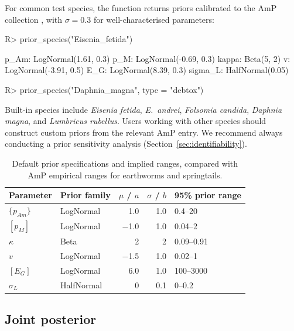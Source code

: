 \documentclass[article,shortnames]{jss}
\newcommand{\pAm}{\{p_{Am}\}}
\newcommand{\pM}{[p_M]}
\newcommand{\EG}{[E_G]}
\begin{document}
For common test species, the function  returns
priors calibrated to the AmP collection \citep{MarquesAmP2018},
with $\sigma = 0.3$ for well-characterised parameters:
\begin{CodeChunk}
\begin{CodeInput}
R> prior_species("Eisenia_fetida")
\end{CodeInput}
\begin{CodeOutput}
  p_Am:    LogNormal(1.61, 0.3)
  p_M:     LogNormal(-0.69, 0.3)
  kappa:   Beta(5, 2)
  v:       LogNormal(-3.91, 0.5)
  E_G:     LogNormal(8.39, 0.3)
  sigma_L: HalfNormal(0.05)
\end{CodeOutput}
\begin{CodeInput}
R> prior_species("Daphnia_magna", type = "debtox")
\end{CodeInput}
\end{CodeChunk}
\noindent
Built-in species include \emph{Eisenia fetida}, \emph{E.~andrei},
\emph{Folsomia candida}, \emph{Daphnia magna}, and
\emph{Lumbricus rubellus}.  Users working with other species should
construct custom priors from the relevant AmP entry.  We recommend
always conducting a prior sensitivity analysis
(Section~\ref{sec:identifiability}).

\begin{table}[t!]
\centering
\caption{Default prior specifications and implied ranges, compared
  with AmP empirical ranges for earthworms and springtails.}
\label{tab:priors}
\begin{tabular}{llrrl}
\toprule
Parameter & Prior family & $\mu$ / $a$ & $\sigma$ / $b$ &
  95\% prior range \\
\midrule
$\pAm$    & LogNormal & 1.0  & 1.0  & 0.4--20 \\
$\pM$     & LogNormal & $-$1.0 & 1.0 & 0.04--2 \\
$\kappa$  & Beta      & 2    & 2    & 0.09--0.91 \\
$v$       & LogNormal & $-$1.5 & 1.0 & 0.02--1 \\
$\EG$     & LogNormal & 6.0  & 1.0  & 100--3000 \\
$\sigma_L$ & HalfNormal & 0 & 0.1 & 0--0.2 \\
\bottomrule
\end{tabular}
\end{table}

\subsection{Joint posterior}
\end{document}
